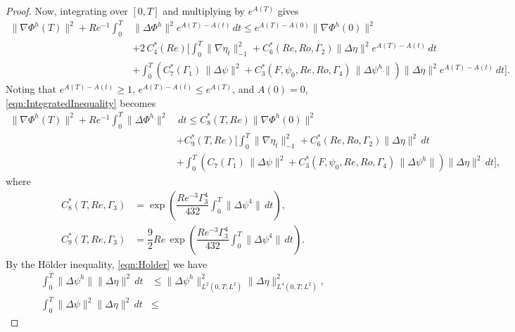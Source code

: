 \begin{proof}
  Now, integrating over $[0,T]$ and multiplying by $e^{A(T)}$ gives
  \begin{equation}
    \begin{split}
      \|\nabla \Phi^h(T)\|^2 + Re^{-1} \int_0^T\! &\|\Delta \Phi^h\|^2
        e^{A(T) - A(t)}\, dt \le e^{A(T) - A(0)} \|\nabla \Phi^h(0)\|^2 \\
      & + 2\, C^*_4(Re)\biggl[ \int_0^T\! \|\nabla \eta_t\|_{-1}^2
        + C^*_6(Re,Ro,\Gamma_2) \|\Delta \eta\|^2 e^{A(T) - A(t)}\, dt \\
      & + \int_0^T\!  \left( C^*_7(\Gamma_1)\, \|\Delta \psi\|^2
        +  C^*_3(F,\psi_0,Re,Ro,\Gamma_4)\,\|\Delta \psi^h\|\right)
        \|\Delta \eta\|^2 e^{A(T) - A(t)}\, dt\biggr].
    \end{split}
    \label{eqn:IntegratedInequality}
  \end{equation}
  Noting that $e^{A(T) - A(t)} \ge 1$, $e^{A(T) - A(t)} \le e^{A(T)}$, and
  $A(0) = 0$, \eqref{eqn:IntegratedInequality} becomes
  \begin{equation}
    \begin{split}
      \|\nabla \Phi^h(T)\|^2 + Re^{-1} \int_0^T\! \|\Delta \Phi^h\|^2 &\, dt
        \le C^*_8(T,Re) \|\nabla \Phi^h(0)\|^2 \\
      & + C^*_9(T,Re)\biggl[ \int_0^T\! \|\nabla \eta_t\|_{-1}^2
        + C^*_6(Re,Ro,\Gamma_2) \|\Delta \eta\|^2\, dt \\
      & + \int_0^T\!  \left( C_7(\Gamma_1)\, \|\Delta \psi\|^2
        + C^*_3(F,\psi_0,Re,Ro,\Gamma_4)\,\|\Delta \psi^h\|\right)
        \|\Delta \eta\|^2\, dt\biggr],
    \end{split} \label{eqn:CTREInequality}
  \end{equation}
  where
  \begin{align}
    C^*_8(T,Re,\Gamma_3) &= \exp\!\left(\dfrac{Re^{-3}\Gamma_3^4}{432}
      \int_{0}^{T}\!\|\Delta \psi^4\|\, dt\right), \label{eqn:C1TRe} \\
    C^*_9(T,Re,\Gamma_3) &= \dfrac{9}{2} Re\, \exp\!\left(\dfrac{Re^{-3}\Gamma_3^4}{432}
      \int_{0}^{T}\!\|\Delta \psi^4\|\, dt\right). \label{eqn:C2TRe}
  \end{align}
  By the H\"older inequality, \eqref{eqn:Holder} we have
  \begin{align}
    \int_0^T\! \|\Delta \psi^h\| \|\Delta \eta\|^2\, dt &\le
      \|\Delta \psi^h\|^2_{L^2(0,T;L^2)} \|\Delta \eta\|^2_{L^4(0,T;L^2)},
    \label{eqn:HolderPsih} \\
    \int_0^T\! \|\Delta \psi\|^2 \|\Delta \eta\|^2\, dt &\le

\end{align}
\end{proof}
